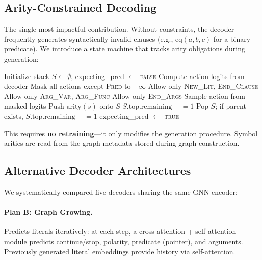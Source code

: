 \documentclass{article}
\begin{document}
\subsection{Arity-Constrained Decoding}
\label{sec:arity}

The single most impactful contribution. Without constraints, the decoder frequently
generates syntactically invalid clauses (e.g., $\text{eq}(a,b,c)$ for a binary
predicate). We introduce a state machine that tracks arity obligations during
generation:

\begin{algorithm}[t]
\caption{Arity-Constrained Decoding}
\label{alg:arity}
\begin{algorithmic}[1]
\STATE Initialize stack $S \leftarrow \emptyset$, expecting\_pred $\leftarrow$ \textsc{false}
    \STATE Compute action logits from decoder
        \STATE Mask all actions except \textsc{Pred} to $-\infty$
        \STATE Allow only \textsc{New\_Lit}, \textsc{End\_Clause}
        \STATE Allow only \textsc{Arg\_Var}, \textsc{Arg\_Func}
        \STATE Allow only \textsc{End\_Args}
    \ENDIF
    \STATE Sample action from masked logits
        \STATE Push $\text{arity}(s)$ onto $S$
        \STATE $S.\text{top.remaining} \mathrel{-}= 1$
        \STATE Pop $S$; if parent exists, $S.\text{top.remaining} \mathrel{-}= 1$
        \STATE expecting\_pred $\leftarrow$ \textsc{true}
    \ENDIF
\ENDFOR
\end{algorithmic}
\end{algorithm}

This requires \textbf{no retraining}---it only modifies the generation procedure.
Symbol arities are read from the graph metadata stored during graph construction.

\subsection{Alternative Decoder Architectures}

We systematically compared five decoders sharing the same GNN encoder:

\paragraph{Plan B: Graph Growing.}
Predicts literals iteratively: at each step, a cross-attention + self-attention
module predicts continue/stop, polarity, predicate (pointer), and arguments.
Previously generated literal embeddings provide history via self-attention.
\end{document}
